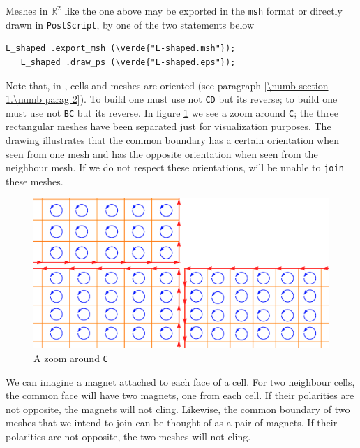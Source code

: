 Meshes in $ \mathbb{R}^2 $ like the one above may be exported in the {\small\tt msh} format
or directly drawn in {\small\tt PostScript}, by one of the two statements below

\begin{Verbatim}[commandchars=\\\{\},formatcom=\small\tt,baselinestretch=0.94]
   L_shaped .export_msh (\verde{"L-shaped.msh"});
   L_shaped .draw_ps (\verde{"L-shaped.eps"});
\end{Verbatim}

Note that, in \maniFEM, cells and meshes are oriented
(see paragraph \ref{\numb section 1.\numb parag 2}).
To build {\small\tt {}} one must use not {\small\tt CD} but its reverse;
to build {\small\tt {}} one must use not {\small\tt BC} but its reverse.
In figure \ref{\numb section 1.\numb fig 6} we see a zoom around {\small\tt C};
the three rectangular meshes have been separated just for visualization purposes.
The drawing illustrates that the common boundary has a certain orientation when seen
from one mesh and has the opposite orientation when seen from the neighbour mesh.
If we do not respect these orientations, {\maniFEM} will be unable to {\small\tt join}
these meshes.

\begin{figure}[ht]  \centering
  \includegraphics[width=120mm]{L-crack}
  \caption{A zoom around {\small\tt C}}
  \label{\numb section 1.\numb fig 6}
\end{figure}

We can imagine a magnet attached to each face of a cell.
For two neighbour cells, the common face will have two magnets, one from each cell.
If their polarities are not opposite, the magnets will not cling.
Likewise, the common boundary of two meshes that we intend to join can be thought of
as a pair of magnets.
If their polarities are not opposite, the two meshes will not cling.

